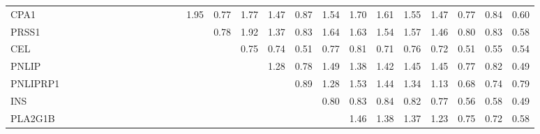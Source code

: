 \begin{longtable}{lrrrrrrrrrrrrrrrrrrrrrrrrr}
CPA1     &              &              &              &             &             &             &             &            &              &            &            &            &        1.95 &      0.77 &        1.77 &           1.47 &      0.87 &          1.54 &      1.70 &        1.61 &        1.55 &       1.47 &       0.77 &        0.84 &        0.60 \\
PRSS1    &              &              &              &             &             &             &             &            &              &            &            &            &             &      0.78 &        1.92 &           1.37 &      0.83 &          1.64 &      1.63 &        1.54 &        1.57 &       1.46 &       0.80 &        0.83 &        0.58 \\
CEL      &              &              &              &             &             &             &             &            &              &            &            &            &             &           &        0.75 &           0.74 &      0.51 &          0.77 &      0.81 &        0.71 &        0.76 &       0.72 &       0.51 &        0.55 &        0.54 \\
PNLIP    &              &              &              &             &             &             &             &            &              &            &            &            &             &           &             &           1.28 &      0.78 &          1.49 &      1.38 &        1.42 &        1.45 &       1.45 &       0.77 &        0.82 &        0.49 \\
PNLIPRP1 &              &              &              &             &             &             &             &            &              &            &            &            &             &           &             &                &      0.89 &          1.28 &      1.53 &        1.44 &        1.34 &       1.13 &       0.68 &        0.74 &        0.79 \\
INS      &              &              &              &             &             &             &             &            &              &            &            &            &             &           &             &                &           &          0.80 &      0.83 &        0.84 &        0.82 &       0.77 &       0.56 &        0.58 &        0.49 \\
PLA2G1B  &              &              &              &             &             &             &             &            &              &            &            &            &             &           &             &                &           &               &      1.46 &        1.38 &        1.37 &       1.23 &       0.75 &        0.72 &        0.58 \\

\end{longtable}
